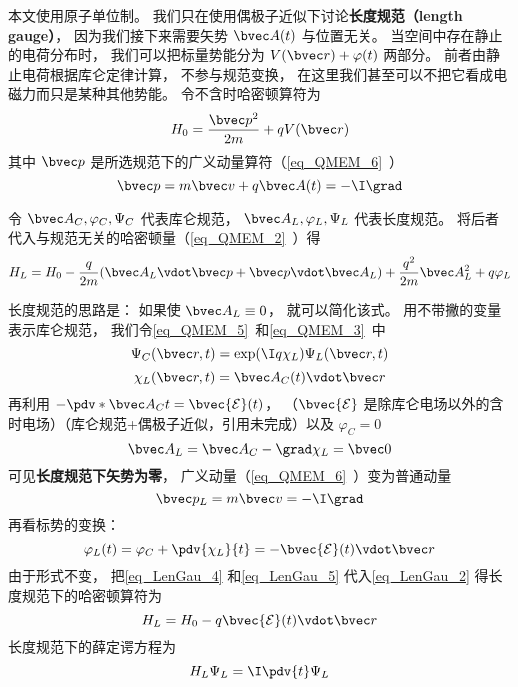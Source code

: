 

本文使用原子单位制。 我们只在使用偶极子近似下讨论\textbf{长度规范（length gauge）}， 因为我们接下来需要矢势 $\bvec A(t)$ 与位置无关。 当空间中存在静止的电荷分布时， 我们可以把标量势能分为 $V(\bvec r) + \varphi(t)$ 两部分。 前者由静止电荷根据库仑定律计算， 不参与规范变换， 在这里我们甚至可以不把它看成电磁力而只是某种其他势能。 令不含时哈密顿算符为
\begin{equation}
H_0 = \frac{\bvec p^2}{2m} + qV(\bvec r)
\end{equation}
其中 $\bvec p$ 是所选规范下的广义动量算符（\autoref{eq_QMEM_6}~）
\begin{equation}
\bvec p = m \bvec v + q\bvec A(t) = -\I \grad
\end{equation}

令 $\bvec A_C, \varphi_C, \Psi_C$ 代表库仑规范， $\bvec A_L, \varphi_L, \Psi_L$ 代表长度规范。 将后者代入与规范无关的哈密顿量（\autoref{eq_QMEM_2}~）得
\begin{equation}\label{eq_LenGau_2}
H_L = H_0 - \frac{q}{2m} (\bvec A_L \vdot \bvec p + \bvec p \vdot \bvec A_L)
+ \frac{q^2}{2m} \bvec A_L^2 + q \varphi_L
\end{equation}


长度规范的思路是： 如果使 $\bvec A_L \equiv 0$， 就可以简化该式。 用不带撇的变量表示库仑规范， 我们令\autoref{eq_QMEM_5}~和\autoref{eq_QMEM_3}~中
\begin{equation}\label{eq_LenGau_1}
\Psi_C(\bvec r, t) = \exp(\I q\chi_L)\Psi_L(\bvec r, t)
\end{equation}
\begin{equation}
\chi_L(\bvec r, t) = \bvec A_C(t) \vdot \bvec r
\end{equation}
再利用 $-\pdv*{\bvec A_C}{t} = \bvec {\mathcal E}(t)$， （$\bvec {\mathcal E}$ 是除库仑电场以外的含时电场）（库仑规范+偶极子近似，引用未完成）以及 $\varphi_C = 0$
\begin{equation}\label{eq_LenGau_4}
\bvec A_L = \bvec A_C - \grad \chi_L = \bvec 0
\end{equation}
可见\textbf{长度规范下矢势为零}， 广义动量（\autoref{eq_QMEM_6}~）变为普通动量
\begin{equation}\label{eq_LenGau_6}
\bvec p_L = m \bvec v = -\I \grad
\end{equation}
再看标势的变换：
\begin{equation}\label{eq_LenGau_5}
\varphi_L(t) = \varphi_C + \pdv{\chi_L}{t} = -\bvec {\mathcal E}(t) \vdot \bvec r
\end{equation}
由于形式不变， 把\autoref{eq_LenGau_4} 和\autoref{eq_LenGau_5} 代入\autoref{eq_LenGau_2} 得长度规范下的哈密顿算符为
\begin{equation}\label{eq_LenGau_7}
H_L = H_0 - q\bvec{\mathcal{E}}(t) \vdot \bvec r
\end{equation}
长度规范下的薛定谔方程为
\begin{equation}\label{eq_LenGau_3}
H_L \Psi_L = \I \pdv{t} \Psi_L
\end{equation}
